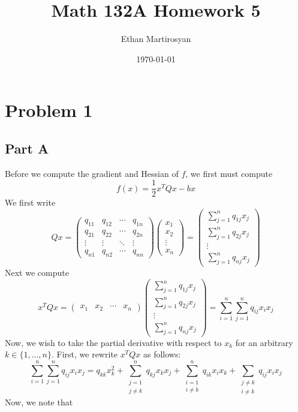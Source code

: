 \documentclass[12pt]{article}
\begin{document}
 
\title{Math 132A Homework 5}
\author{Ethan Martirosyan}
\date{\today}
\maketitle
{}
\hfuzz=50pt
\section*{Problem 1}
\subsection*{Part A}
Before we compute the gradient and Hessian of $f$, we first must compute
\[
f(x) = \frac{1}{2}x^T Q x - bx
\] We first write
\[
Qx = \begin{pmatrix}
q_{11} & q_{12} & \cdots & q_{1n}\\
q_{21} & q_{22} & \cdots & q_{2n}\\
\vdots & \vdots & \ddots & \vdots\\
q_{n1} & q_{n2} & \cdots & q_{nn}
\end{pmatrix}
\begin{pmatrix}
x_1 \\ x_2 \\ \vdots \\ x_n
\end{pmatrix}
=
\begin{pmatrix}
\sum_{j=1}^n q_{1j}x_j\\
\sum_{j=1}^n q_{2j}x_j\\
\vdots\\
\sum_{j=1}^n q_{nj}x_j
\end{pmatrix}
\] Next we compute
\[
x^TQx =
\begin{pmatrix}
x_1 & x_2 & \cdots & x_n
\end{pmatrix}
\begin{pmatrix}
\sum_{j=1}^n q_{1j}x_j\\
\sum_{j=1}^n q_{2j}x_j\\
\vdots\\
\sum_{j=1}^n q_{nj}x_j
\end{pmatrix} = \sum_{i=1}^n \sum_{j=1}^n q_{ij} x_i x_j
\] Now, we wish to take the partial derivative with respect to $x_k$ for an arbitrary $k \in \{1,\ldots,n\}$. First, we rewrite $x^TQx$ as follows:
\[
\sum_{i=1}^n \sum_{j=1}^n q_{ij} x_i x_j = q_{kk}x_k^2 + \sum\limits_{\substack{j=1 \\ j \neq k }}^n q_{kj} x_{k} x_{j} + \sum\limits_{\substack{i=1 \\ i\neq k }}^n q_{ik}x_{i}x_{k} + \sum\limits_{\substack{j\neq k \\ i \neq k }} q_{ij}x_{i}x_{j}
\] Now, we note that
\end{document}
